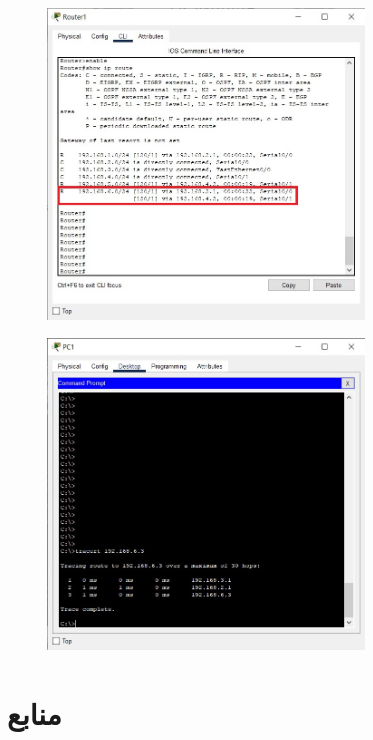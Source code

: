 \documentclass{article}
\begin{document}
\begin{figure}[H]
    \centering
    \includegraphics[width=0.75\textwidth]{figures/22.jpg}
    \caption{}
    \label{fig:fig1}
\end{figure}


\begin{figure}[H]
    \centering
    \includegraphics[width=0.75\textwidth]{figures/23.jpg}
    \caption{}
    \label{fig:fig1}
\end{figure}



\section*{منابع}
\renewcommand{\section}[2]{}%
\begin{thebibliography}{99} %


\begin{LTRitems}

\resetlatinfont

\end{LTRitems}

\end{thebibliography}
\end{document}

